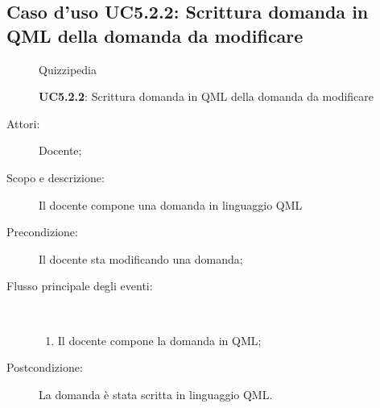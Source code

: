 \subsection{Caso d'uso UC5.2.2: Scrittura domanda in QML della domanda da modificare}
	\begin{figure}[H]
		\centering
		\begin{resizedtikzpicture}{\textwidth}
		\begin{umlsystem}[x=0, fill=lightgray!20]{Quizzipedia}
		\end{umlsystem}
		\end{resizedtikzpicture}
		\caption{\textbf{UC5.2.2}: Scrittura domanda in QML della domanda da modificare}
		\label{UC5.2.2}
	\end{figure}
\begin{description}
\item[Attori:] Docente;
\item[Scopo e descrizione:] Il docente compone una domanda in linguaggio QML
      \item[Precondizione:] Il docente sta modificando una domanda;

        \item[Flusso principale degli eventi:] \ 
 \begin{enumerate}
          \item Il docente compone la domanda in QML;

      \end{enumerate}
    \item[Postcondizione:] La domanda è stata scritta in linguaggio QML.
  \end{description}
\hypertarget{UC5.2.3}{}
